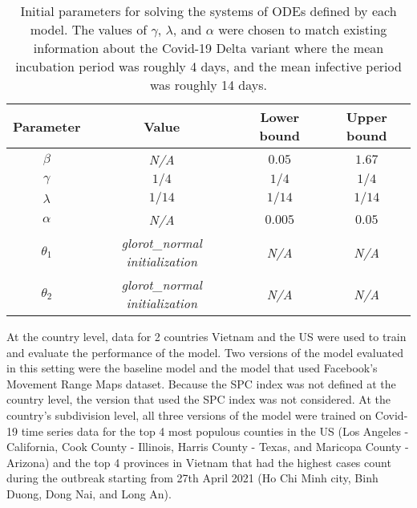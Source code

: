 \begin{table}[h]
    \centering
    \begin{tabular}{| c | c | c | c |}
        Parameter & Value & Lower bound & Upper bound \\
        \hline\hline
        $\beta$ & \textit{N/A} & $0.05$ & $1.67$ \\
        \hline
        $\gamma$ & $1/4$ & $1/4$ & $1/4$ \\
        \hline
        $\lambda$ & $1/14$ & $1/14$ & $1/14$ \\
        \hline
        $\alpha$ & \textit{N/A} & $0.005$ & $0.05$ \\
        \hline
        $\theta_1$ & \textit{glorot\_normal initialization} & \textit{N/A} & \textit{N/A} \\
        \hline
        $\theta_2$ & \textit{glorot\_normal initialization} & \textit{N/A} & \textit{N/A} \\
        \hline
    \end{tabular}
    \caption{Initial parameters for solving the systems of \glspl{ODE} defined by each model. The values of $\gamma$, $\lambda$, and $\alpha$ were chosen to match existing information about the Covid-19 Delta variant \cite{mahaseDeltaVariantWhat2021} where the mean incubation period was roughly 4 days, and the mean infective period was roughly 14 days.}
    \label{tab:ude-model-initial-parameters}
\end{table}

At the country level, data for 2 countries Vietnam and the \gls{US} were used to train and evaluate the performance of the model.
Two versions of the model evaluated in this setting were the baseline model and the model that used Facebook's Movement Range Maps dataset.
Because the \gls{SPC} index was not defined at the country level, the version that used the \gls{SPC} index was not considered.
At the country's subdivision level, all three versions of the model were trained on Covid-19 time series data for the top 4 most populous counties in the \gls{US} (Los Angeles - California, Cook County - Illinois, Harris County - Texas, and Maricopa County - Arizona) and the top 4 provinces in Vietnam that had the highest cases count during the outbreak starting from 27th April 2021 (Ho Chi Minh city, Binh Duong, Dong Nai, and Long An).

